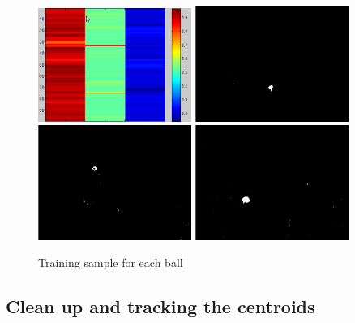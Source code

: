 \documentclass[10pt,a4paper,oneclumn]{article}
\begin{document}
\begin{figure}[h!]
\centering
  \includegraphics[width=5cm]{figures/training.png}
  \includegraphics[width=5cm]{figures/class1.png}
  \includegraphics[width=5cm]{figures/class2.png}
  \includegraphics[width=5cm]{figures/class3.png}
\caption{Training sample for each ball}
\end{figure}

\subsection{Clean up and tracking the centroids}
\end{document}
